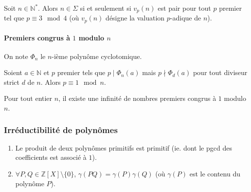 	\begin{theorem}
		Soit $n \in \mathbb{N}^*$. Alors $n \in \Sigma$ si et seulement si $v_p(n)$ est pair pour tout $p$ premier tel que $p \equiv 3 \mod 4$ (où $v_p(n)$ désigne la valuation $p$-adique de $n$).
	\end{theorem}
	
	\paragraph{Premiers congrus à \texorpdfstring{$1$}{1} modulo \texorpdfstring{$n$}{n}}
	
	
	\begin{notation}
		On note $\Phi_n$ le $n$-ième polynôme cyclotomique.
	\end{notation}
	
	\begin{lemma}
		Soient $a \in \mathbb{N}$ et $p$ premier tels que $p \mid \Phi_n(a)$ mais $p \nmid \Phi_d(a)$ pour tout diviseur strict $d$ de $n$. Alors $p \equiv 1 \mod n$.
	\end{lemma}
	
	
	\begin{theorem}
		Pour tout entier $n$, il existe une infinité de nombres premiers congrus à $1$ modulo $n$.
	\end{theorem}
	
	\subsubsection{Irréductibilité de polynômes}
	
	
	\begin{lemma}[Gauss]
		\begin{enumerate}[label=(\roman*)]
			\item Le produit de deux polynômes primitifs est primitif (ie. dont le pgcd des coefficients est associé à $1$).
			\item $\forall P, Q \in \mathbb{Z}[X] \setminus \{ 0 \}$, $\gamma(PQ) = \gamma(P) \gamma(Q)$ (où $\gamma(P)$ est le contenu du polynôme $P$).
		\end{enumerate}
	\end{lemma}
	
	
